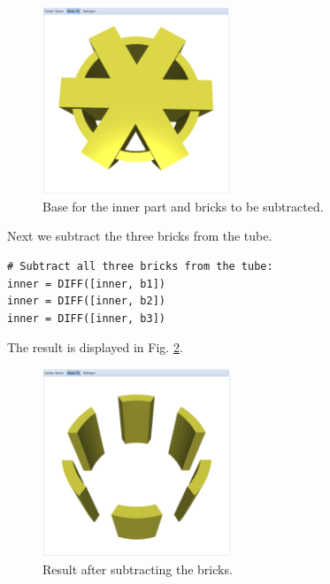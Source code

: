 \documentclass{article}
\begin{document}
\newpage
\begin{figure}[!ht]
\begin{center}
\includegraphics[width=0.5\textwidth]{img/gear-8.png}
\end{center}
\vspace{-2mm}
\caption{Base for the inner part and bricks to be subtracted.}
\label{fig:gear-8}
\end{figure}
\noindent
Next we subtract the three bricks from the tube. 

{\small
\begin{verbatim}
# Subtract all three bricks from the tube:
inner = DIFF([inner, b1])
inner = DIFF([inner, b2])
inner = DIFF([inner, b3])
\end{verbatim}
}
\noindent
The result is displayed in Fig. \ref{fig:gear-9}.
\newpage
\begin{figure}[!ht]
\begin{center}
\includegraphics[width=0.5\textwidth]{img/gear-9.png}
\end{center}
\vspace{-2mm}
\caption{Result after subtracting the bricks.}
\label{fig:gear-9}
\end{figure}
\end{document}
